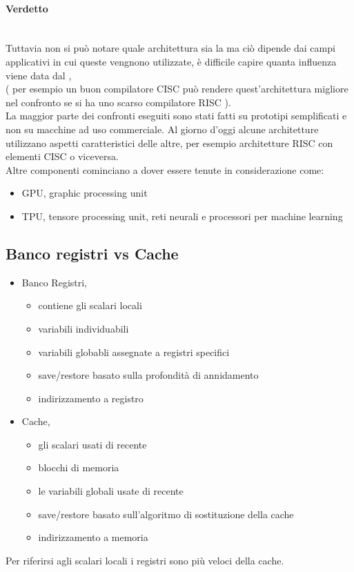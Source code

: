 \documentclass[arch.tex]{subfiles}
\begin{document}
\paragraph{Verdetto} \mbox{} \\%
\label{par:verdetto}
Tuttavia non si può notare quale architettura sia la  ma ciò dipende dai campi
applicativi in cui queste vengnono utilizzate, è difficile capire quanta influenza viene
data dal ,\\
( per esempio un buon compilatore CISC può rendere quest'architettura
migliore nel confronto se si ha uno scarso compilatore RISC ).\\
La maggior parte dei confronti eseguiti sono stati fatti su prototipi semplificati 
e non su macchine ad uso commerciale. 
Al giorno d'oggi alcune architetture utilizzano aspetti caratteristici delle
altre, per esempio architetture RISC con elementi CISC o viceversa.\\
Altre componenti cominciano a dover essere tenute in considerazione come:

\begin{itemize}
	\item GPU, graphic processing unit
	\item TPU, tensore processing unit, reti neurali e processori per machine learning
\end{itemize}

\subsection{Banco registri vs Cache}%
\label{sub:banco_registri_vs_cache}

\begin{itemize}
	\item Banco Registri,
		\begin{itemize}
			\item contiene  gli scalari locali
			\item variabili individuabili
			\item variabili globabli assegnate a registri specifici
			\item save/restore basato sulla profondità di annidamento
			\item indirizzamento a registro
		\end{itemize}
	\item Cache,
		\begin{itemize}
			\item {} gli scalari usati di recente
			\item blocchi di memoria
			\item {} le variabili globali usate di recente
			\item save/restore basato sull'algoritmo di sostituzione della cache
			\item indirizzamento a memoria
		\end{itemize}
\end{itemize}
Per riferirsi agli scalari locali i registri sono più veloci della cache.
\end{document}
